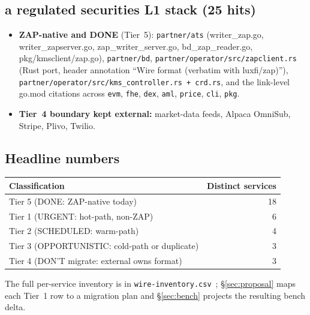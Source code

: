 \subsection{a regulated securities L1 stack (25 hits)}

\begin{itemize}[leftmargin=*]
  \item \textbf{ZAP-native and DONE} (Tier~5):
        \texttt{partner/ats} (writer\_zap.go, writer\_zapserver.go,
        zap\_writer\_server.go, bd\_zap\_reader.go,
        pkg/kmsclient/zap.go), \texttt{partner/bd},
        \texttt{partner/operator/src/zapclient.rs} (Rust port, header
        annotation ``Wire format (verbatim with luxfi/zap)''),
        \texttt{partner/operator/src/kms\_controller.rs +
        crd.rs}, and the link-level go.mod citations across
        \texttt{evm}, \texttt{fhe}, \texttt{dex}, \texttt{aml},
        \texttt{price}, \texttt{cli}, \texttt{pkg}.
  \item \textbf{Tier~4 boundary kept external:} market-data feeds,
        Alpaca OmniSub, Stripe, Plivo, Twilio.
\end{itemize}

\subsection{Headline numbers}

\begin{center}
\begin{tabular}{lr}
\toprule
\textbf{Classification} & \textbf{Distinct services} \\
\midrule
Tier 5 (DONE: ZAP-native today)                  & 18 \\
Tier 1 (URGENT: hot-path, non-ZAP)                & 6  \\
Tier 2 (SCHEDULED: warm-path)                     & 4  \\
Tier 3 (OPPORTUNISTIC: cold-path or duplicate)    & 3  \\
Tier 4 (DON'T migrate: external owns format)      & 3  \\
\bottomrule
\end{tabular}
\end{center}

The full per-service inventory is in
\texttt{wire-inventory.csv}~\cite{wireinv}; \S\ref{sec:proposal}
maps each Tier~1 row to a migration plan and \S\ref{sec:bench}
projects the resulting bench delta.
